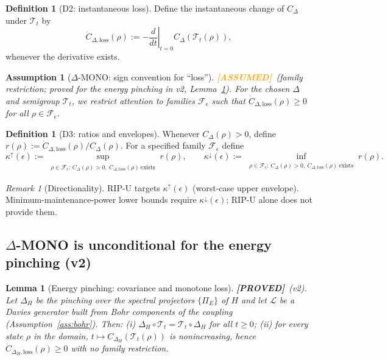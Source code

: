\documentclass[11pt]{article}
\newtheorem{lemma}[theorem]{Lemma}
\newtheorem{assumption}[theorem]{Assumption}
\theoremstyle{definition}
\newtheorem{definition}[theorem]{Definition}
\theoremstyle{remark}
\newtheorem{remark}[theorem]{Remark}
\newcommand{\ASSUMED}{\textcolor{orange}{\textbf{[ASSUMED]}}}
\newcommand{\PROVED}{\textcolor{green!60!black}{\textbf{[PROVED]}}}
\begin{document}
\begin{definition}[D2: instantaneous loss]
\label{def:loss}
Define the instantaneous change of $C_\Delta$ under $\mathcal{T}_t$ by
\[
\dot{C}_{\Delta,\mathrm{loss}}(\rho) := -\left.\frac{d}{dt}\right|_{t=0}
C_\Delta(\mathcal{T}_t(\rho)),
\]
whenever the derivative exists.
\end{definition}

\begin{assumption}[$\Delta$-MONO: sign convention for ``loss'']
\label{ass:dmono}
\ASSUMED\ (family restriction; \emph{proved for the energy pinching in
v2}, Lemma~\ref{lem:dmono}). For the chosen $\Delta$ and semigroup
$\mathcal{T}_t$, we restrict attention to families $\mathcal{F}_\epsilon$
such that $\dot{C}_{\Delta,\mathrm{loss}}(\rho) \ge 0$ for all
$\rho \in \mathcal{F}_\epsilon$.
\end{assumption}

\begin{definition}[D3: ratios and envelopes]
\label{def:ratios}
Whenever $C_\Delta(\rho) > 0$, define
$r(\rho) := \dot{C}_{\Delta,\mathrm{loss}}(\rho) / C_\Delta(\rho)$.
For a specified family $\mathcal{F}_\epsilon$ define
\[
\kappa^{\uparrow}(\epsilon) := \sup_{\substack{\rho\in\mathcal{F}_\epsilon:\,
C_\Delta(\rho)>0,\ \dot{C}_{\Delta,\mathrm{loss}}(\rho)\ \mathrm{exists}}}
r(\rho), \qquad
\kappa^{\downarrow}(\epsilon) := \inf_{\substack{\rho\in\mathcal{F}_\epsilon:\,
C_\Delta(\rho)>0,\ \dot{C}_{\Delta,\mathrm{loss}}(\rho)\ \mathrm{exists}}}
r(\rho).
\]
\end{definition}

\begin{remark}[Directionality]
\label{rem:dir}
RIP-U targets $\kappa^{\uparrow}(\epsilon)$ (worst-case upper envelope).
Minimum-maintenance-power lower bounds require
$\kappa^{\downarrow}(\epsilon)$; RIP-U alone does not provide them.
\end{remark}

\subsection{$\Delta$-MONO is unconditional for the energy pinching (v2)}

\begin{lemma}[Energy pinching: covariance and monotone loss]
\label{lem:dmono}
\PROVED\ (v2). Let $\Delta_H$ be the pinching over the spectral projectors
$\{\Pi_E\}$ of $H$ and let $\mathcal{L}$ be a Davies generator built from
Bohr components of the coupling (Assumption~\ref{ass:bohr}). Then:
\emph{(i)} $\Delta_H \circ \mathcal{T}_t = \mathcal{T}_t \circ \Delta_H$
for all $t \ge 0$; \emph{(ii)} for every state $\rho$ in the domain,
$t \mapsto C_{\Delta_H}(\mathcal{T}_t(\rho))$ is nonincreasing, hence
$\dot{C}_{\Delta_H,\mathrm{loss}}(\rho) \ge 0$ with no family
restriction.
\end{lemma}
\end{document}
